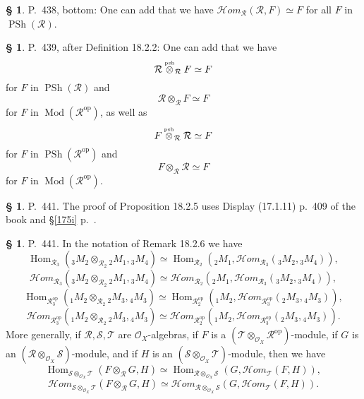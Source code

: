 \documentclass[12pt]{article}
\theoremstyle{remark}
\theoremstyle{definition}
\newtheorem{s}[thm]{\S}
\newcommand{\cc}{\mathcal}
\newcommand{\oo}{\operatorname}
\newcommand{\HOM}{\cc H\!\mathit{om}}
\DeclareMathOperator{\Hom}{Hom}
\DeclareMathOperator{\Mod}{Mod}
\DeclareMathOperator{\op}{op}
\begin{document}
% 

\begin{s}\label{homrr}
P.~438, bottom: One can add that we have $\HOM_{\cc R}(\cc R,F)\simeq F$ for all $F$ in $\oo{PSh}(\cc R)$. 
\end{s} 

% 

\begin{s}\label{neutral}
P.~439, after Definition 18.2.2: One can add that we have 
$$
\cc R\overset{\text{\tiny psh}}{\otimes}_{\cc R}F\simeq F
$$ 
for $F$ in $\oo{PSh}(\cc R)$ and 
$$
\cc R\otimes_{\cc R}F\simeq F
$$ 
for $F$ in $\Mod(\cc R^{\op})$, as well as 
$$F\overset{\text{\tiny psh}}{\otimes}_{\cc R}\cc R\simeq F
$$ 
for $F$ in $\oo{PSh}(\cc R^{\op})$ and 
$$
F\otimes_{\cc R}\cc R\simeq F
$$ 
for $F$ in $\Mod(\cc R^{\op})$. 
\end{s} 

% 

\begin{s}
P.~441. The proof of Proposition 18.2.5 uses Display (17.1.11) p.~409 of the book and \S\ref{175i} p.~\pageref{175i}. 
\end{s} 

% 

\begin{s} 
P.~441. In the notation of Remark 18.2.6 we have 
$$
\Hom_{\cc R_3}({}_3M_2\otimes_{\cc R_2}{}_2M_1,{}_3M_4)\simeq
\Hom_{\cc R_2}({}_2M_1,\HOM_{\cc R_3}({}_3M_2,{}_3M_4)),
$$
$$
\HOM_{\cc R_3}({}_3M_2\otimes_{\cc R_2}{}_2M_1,{}_3M_4)\simeq
\HOM_{\cc R_2}({}_2M_1,\HOM_{\cc R_3}({}_3M_2,{}_3M_4)),
$$ 
$$
\Hom_{\cc R_3^{\op}}({}_1M_2\otimes_{\cc R_2}{}_2M_3,{}_4M_3)\simeq
\Hom_{\cc R_2^{\op}}({}_1M_2,\HOM_{\cc R_3^{\op}}({}_2M_3,{}_4M_3)),
$$ 
$$
\HOM_{\cc R_3^{\op}}({}_1M_2\otimes_{\cc R_2}{}_2M_3,{}_4M_3)\simeq
\HOM_{\cc R_2^{\op}}({}_1M_2,\HOM_{\cc R_3^{\op}}({}_2M_3,{}_4M_3)).
$$ 
More generally, if $\cc{R,S,T}$ are $\cc O_X$-algebras, if $F$ is a $(\cc T\otimes_{\cc O_X}\cc R^{\op})$-module, if $G$ is an $(\cc R\otimes_{\cc O_X}\cc S)$-module, and if $H$ is an $(\cc S\otimes_{\cc O_X}\cc T)$-module, then we have 
$$ 
\Hom_{\cc S\otimes_{\cc O_X}\cc T}(F\otimes_{\cc R}G,H)\simeq
\Hom_{\cc R\otimes_{\cc O_X}\cc S}(G,\HOM_{\cc T}(F,H)), 
$$ 
\begin{equation}\label{HOM}
\HOM_{\cc S\otimes_{\cc O_X}\cc T}(F\otimes_{\cc R}G,H)\simeq
\HOM_{\cc R\otimes_{\cc O_X}\cc S}(G,\HOM_{\cc T}(F,H)). 
\end{equation}
\end{s} 
\end{document}
